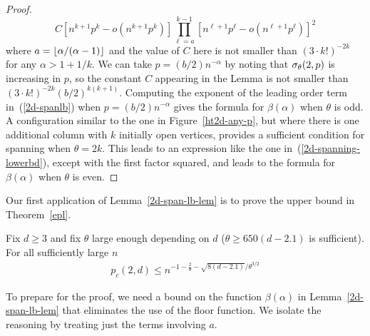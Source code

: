 \begin{proof}
\begin{equation}
\label{2d-spanlb}
C \left[n^{k+1}p^k - o(n^{k+1}p^k)\right] \prod_{\ell = a}^{k-1} \left[ n^{\ell + 1}p^{\ell} - o(n^{\ell+1}p^\ell)\right]^2
\end{equation}
where $a = \left\lfloor\alpha / (\alpha-1)\right \rfloor$ and the value of $C$ here is not smaller than $(3\cdot k!)^{-2k}$ for any $\alpha>1+1/k$.  We can take $p = (b/2)n^{-\alpha}$ by noting  that $\sigma_\theta(2,p)$ is increasing in $p$, so the constant $C$ appearing in the Lemma is not smaller than $(3\cdot k!)^{-2k}(b/2)^{k(k+1)}$.  Computing the exponent of the leading order term in~(\ref{2d-spanlb}) when $p = (b/2)n^{-\alpha}$ gives the formula for $\beta(\alpha)$ when $\theta$ is odd.  A configuration similar to the one in Figure~\ref{ht2d-any-p}, but where there is one additional column with $k$ initially open vertices, provides a sufficient condition for spanning when $\theta = 2k$.  This leads to an expression like the one in~(\ref{2d-spanning-lowerbd}), except with the first factor squared, and leads to the formula for $\beta(\alpha)$ when $\theta$ is even.
\end{proof}

Our first application of Lemma~\ref{2d-span-lb-lem} is to prove the upper bound in Theorem~\ref{epl}.

\begin{theorem}
\label{2d-largetheta-upper-thm}
Fix $d\geq 3$ and fix $\theta$ large enough depending on $d$ ($\theta \geq 650(d-2.1)$ is sufficient).  For all sufficiently large $n$
\begin{align*}
p_c(2,d) \leq n^{-1 - \frac{2}{\theta} - \sqrt{8(d-2.1)}/\theta^{3/2}}
\end{align*}
\end{theorem}

To prepare for the proof, we need a bound on the function $\beta(\alpha)$ in Lemma~\ref{2d-span-lb-lem} that eliminates the use of the floor function.  We isolate the reasoning by treating just the terms involving $a$.


